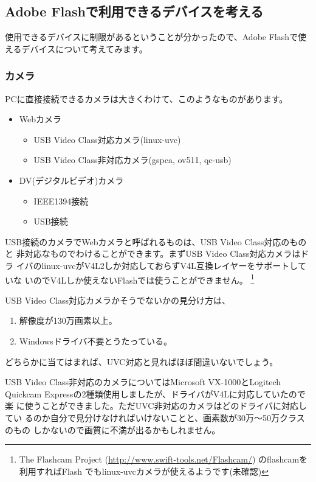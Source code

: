 \documentclass[mingoth,a4paper]{jsarticle}
\begin{document}
\subsection{Adobe Flashで利用できるデバイスを考える}

使用できるデバイスに制限があるということが分かったので、Adobe Flashで使
えるデバイスについて考えてみます。

\subsubsection{カメラ}

PCに直接接続できるカメラは大きくわけて、このようなものがあります。

\begin{itemize}
 \item Webカメラ
       \begin{itemize}
	\item USB Video Class対応カメラ(linux-uvc)
	\item USB Video Class非対応カメラ(gspca, ov511, qc-usb)
       \end{itemize}
 \item DV(デジタルビデオ)カメラ
       \begin{itemize}
	\item IEEE1394接続
	\item USB接続
       \end{itemize}
\end{itemize}

USB接続のカメラでWebカメラと呼ばれるものは、USB Video Class対応のものと
非対応なものでわけることができます。まずUSB Video Class対応カメラはドラ
イバのlinux-uvcがV4L2しか対応しておらずV4L互換レイヤーをサポートしていな
いのでV4Lしか使えないFlashでは使うことができません。
\footnote{The Flashcam Project
(\url{http://www.swift-tools.net/Flashcam/}) のflashcamを利用すればFlash
でもlinux-uvcカメラが使えるようです(未確認)}


USB Video Class対応カメラかそうでないかの見分け方は、

\begin{enumerate}
 \item 解像度が130万画素以上。
 \item Windowsドライバ不要とうたっている。
\end{enumerate}

どちらかに当てはまれば、UVC対応と見ればほぼ間違いないでしょう。

USB Video Class非対応のカメラについてはMicrosoft VX-1000とLogitech
Quickcam Expressの2種類使用しましたが、ドライバがV4Lに対応していたので楽
に使うことができました。ただUVC非対応のカメラはどのドライバに対応してい
るのか自分で見分けなければいけないことと、画素数が30万〜50万クラスのもの
しかないので画質に不満が出るかもしれません。
\end{document}
